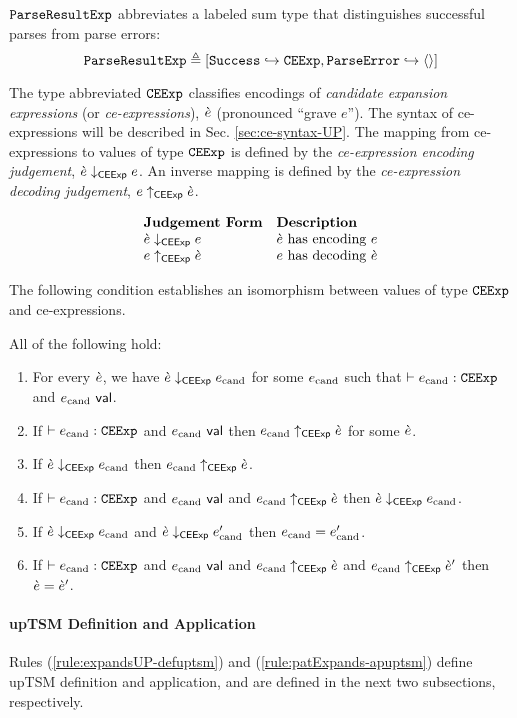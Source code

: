 {{{{$\mathtt{ParseResultExp}$ abbreviates a labeled sum type that distinguishes successful parses from parse errors:
\[\mathtt{ParseResultExp} \triangleq [\mathtt{Success} \hookrightarrow \mathtt{CEExp}, \mathtt{ParseError} \hookrightarrow \langle  \rangle]\] 

The type abbreviated $\mathtt{CEExp}$ classifies encodings of \emph{candidate expansion expressions} (or \emph{ce-expressions}), $\grave{e}$ (pronounced ``grave $e$''). The syntax of ce-expressions will be described in Sec. \ref{sec:ce-syntax-UP}. The mapping from ce-expressions to values of type $\mathtt{CEExp}$ is defined by the \emph{ce-expression encoding judgement}, $\grave{e} \downarrow_\mathsf{CEExp} e$. An inverse mapping is defined by the \emph{ce-expression decoding judgement}, $e \uparrow_\mathsf{CEExp} \grave{e}$.

\[\begin{array}{ll}
\textbf{Judgement Form} & \textbf{Description}\\
\grave{e} \downarrow_\mathsf{CEExp} e & \text{$\grave{e}$ has encoding $e$}\\
e \uparrow_\mathsf{CEExp} \grave{e} & \text{$e$ has decoding $\grave{e}$}
\end{array}\]

The following condition establishes an isomorphism between values of type $\mathtt{CEExp}$ and ce-expressions.

\begin{condition} All of the following hold:
\begin{enumerate}
\item For every $\grave{e}$, we have $\grave{e} \downarrow_\mathsf{CEExp} e_\text{cand}$ for some $e_\text{cand}$ such that $\vdash e_\text{cand} : \mathtt{CEExp}$ and $e_\text{cand}~\mathsf{val}$.
\item If $\vdash e_\text{cand} : \mathtt{CEExp}$ and $e_\text{cand}~\mathsf{val}$ then $e_\text{cand} \uparrow_\mathsf{CEExp} \grave{e}$ for some $\grave{e}$.
\item If $\grave{e} \downarrow_\mathsf{CEExp} e_\text{cand}$ then $e_\text{cand} \uparrow_\mathsf{CEExp} \grave{e}$.
\item If $\vdash e_\text{cand} : \mathtt{CEExp}$ and $e_\text{cand}~\mathsf{val}$ and $e_\text{cand} \uparrow_\mathsf{CEExp} \grave{e}$ then $\grave{e} \downarrow_\mathsf{CEExp} e_\text{cand}$.
\item If $\grave{e} \downarrow_\mathsf{CEExp} e_\text{cand}$ and $\grave{e} \downarrow_\mathsf{CEExp} e_\text{cand}'$ then $e_\text{cand}=e_\text{cand}'$.
\item If $\vdash e_\text{cand} : \mathtt{CEExp}$ and $e_\text{cand}~\mathsf{val}$ and $e_\text{cand} \uparrow_\mathsf{CEExp} \grave{e}$ and $e_\text{cand} \uparrow_\mathsf{CEExp} \grave{e}'$ then $\grave{e}=\grave{e}'$.
\end{enumerate}
\end{condition}

\paragraph{upTSM Definition and Application}
Rules (\ref{rule:expandsUP-defuptsm}) and (\ref{rule:patExpands-apuptsm}) define upTSM definition and application, and are defined in the next two subsections, respectively.





}}}}

